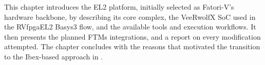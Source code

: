 This chapter introduces the EL2 platform, initially selected as \ac{Fatori-V}'s hardware backbone, by describing its core complex, the VeeRwolfX \ac{SoC} used in the RVfpgaEL2 Basys3 flow, and the available tools and execution workflows. It then presents the planned \acp{FTM} integrations, and a report on every modification attempted. The chapter concludes with the reasons that motivated the transition to the Ibex-based approach in .

